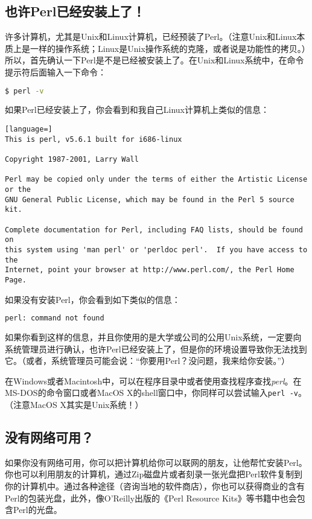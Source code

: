\subsection{也许Perl已经安装上了！}
许多计算机，尤其是Unix和Linux计算机，已经预装了Perl。（注意Unix和Linux本质上是一样的操作系统；Linux是Unix操作系统的克隆，或者说是功能性的拷贝。）所以，首先确认一下Perl是不是已经被安装上了。在Unix和Linux系统中，在命令提示符后面输入一下命令：

\begin{lstlisting}[language=bash]
$ perl -v
\end{lstlisting}

如果Perl已经安装上了，你会看到和我自己Linux计算机上类似的信息：

\begin{lstlisting}[language=]
This is perl, v5.6.1 built for i686-linux

Copyright 1987-2001, Larry Wall

Perl may be copied only under the terms of either the Artistic License or the
GNU General Public License, which may be found in the Perl 5 source kit.

Complete documentation for Perl, including FAQ lists, should be found on
this system using 'man perl' or 'perldoc perl'.  If you have access to the
Internet, point your browser at http://www.perl.com/, the Perl Home Page.
\end{lstlisting}

如果没有安装Perl，你会看到如下类似的信息：

\begin{lstlisting}[language=sh]
perl: command not found
\end{lstlisting}

如果你看到这样的信息，并且你使用的是大学或公司的公用Unix系统，一定要向系统管理员进行确认，也许Perl已经安装上了，但是你的环境设置导致你无法找到它。（或者，系统管理员可能会说：“你要用Perl？没问题，我来给你安装。”）

在Windows或者Macintosh中，可以在程序目录中或者使用查找程序查找\textit{perl}。在MS-DOS的命令窗口或者MacOS X的shell窗口中，你同样可以尝试输入\verb|perl -v|。（注意MacOS X其实是Unix系统！）

\subsection{没有网络可用？}
如果你没有网络可用，你可以把计算机给你可以联网的朋友，让他帮忙安装Perl。你也可以利用朋友的计算机，通过Zip磁盘片或者刻录一张光盘把Perl软件复制到你的计算机中。通过各种途径（咨询当地的软件商店），你也可以获得商业的含有Perl的包装光盘，此外，像O'Reilly出版的《Perl Resource Kits》等书籍中也会包含Perl的光盘。

